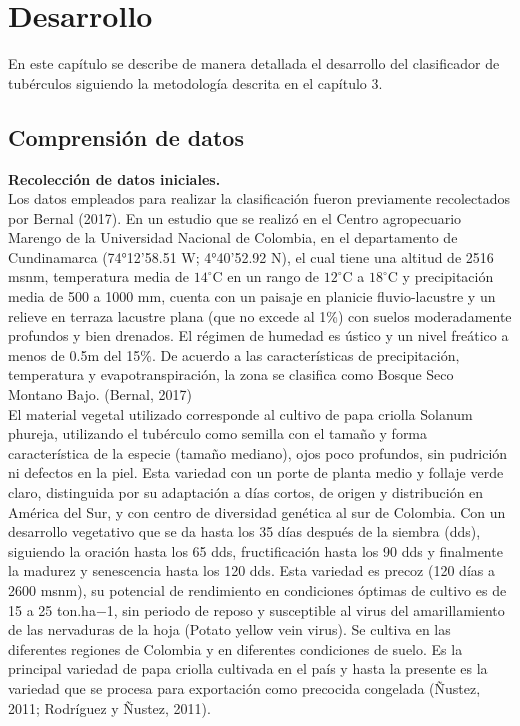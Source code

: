 \chapter{Desarrollo} 

En este capítulo se describe de manera detallada el desarrollo del clasificador de tubérculos siguiendo la metodología descrita en el capítulo 3.
\noindent	
\section{Comprensión de datos}

\noindent
\textbf{Recolección de datos iniciales.}\\

Los datos empleados para realizar la clasificación fueron previamente recolectados por Bernal (2017). En un estudio que se realizó en el Centro agropecuario Marengo de la Universidad Nacional de Colombia, en el departamento de Cundinamarca (74°12'58.51 W; 4°40'52.92 N), el cual tiene una altitud de 2516 msnm, temperatura media de $14^\circ$C  en un rango de $12^\circ$C  a $18^\circ$C  y precipitación media de 500 a 1000 mm, cuenta con un paisaje en planicie fluvio-lacustre y un relieve en terraza lacustre plana (que no excede al 1\%) con suelos moderadamente profundos y bien drenados. El régimen de humedad es ústico y un nivel freático a menos de 0.5m del 15\%. De acuerdo a las características de precipitación, temperatura y evapotranspiración, la zona se clasifica como Bosque Seco Montano Bajo. (Bernal, 2017)\\

El material vegetal utilizado corresponde al cultivo de papa criolla Solanum phureja, utilizando el tubérculo como semilla con el tamaño y forma característica de la especie (tamaño mediano), ojos poco profundos, sin pudrición ni defectos en la piel. Esta variedad con un porte de planta medio y follaje verde claro, distinguida por su adaptación a días cortos, de origen y distribución en América del Sur, y con centro de diversidad genética al sur de Colombia. Con un desarrollo vegetativo que se da hasta los 35 días después de la siembra (dds), siguiendo la oración hasta los 65 dds, fructificación hasta los 90 dds y finalmente la madurez y senescencia hasta los 120 dds. Esta variedad es precoz (120 días a 2600 msnm), su potencial de rendimiento en condiciones óptimas de cultivo es de 15 a 25 ton.ha−1, sin periodo de reposo y susceptible al virus del amarillamiento de las nervaduras de la hoja (Potato yellow vein virus). Se cultiva en las diferentes regiones de Colombia y en diferentes condiciones de suelo. Es la principal variedad de papa criolla cultivada en el país y hasta la presente es la variedad que se procesa para exportación como precocida congelada (Ñustez, 2011; Rodríguez y Ñustez, 2011).\\

